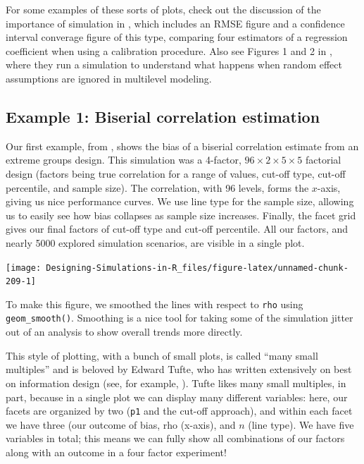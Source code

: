 \documentclass[
]{book}
\begin{document}
For some examples of these sorts of plots, check out the discussion of the importance of simulation in \citet{little2013praise}, which includes an RMSE figure and a confidence interval converage figure of this type, comparing four estimators of a regression coefficient when using a calibration procedure.
Also see Figures 1 and 2 in \citet{antonakis2021ignoring}, where they run a simulation to understand what happens when random effect assumptions are ignored in multilevel modeling.

\subsection{Example 1: Biserial correlation estimation}\label{example-1-biserial-correlation-estimation}

Our first example, from \citet{pustejovsky2014converting}, shows the bias of a biserial correlation estimate from an extreme groups design.
This simulation was a 4-factor, \(96 \times 2 \times 5 \times 5\) factorial design (factors being true correlation for a range of values, cut-off type, cut-off percentile, and sample size).
The correlation, with 96 levels, forms the \(x\)-axis, giving us nice performance curves.
We use line type for the sample size, allowing us to easily see how bias collapses as sample size increases.
Finally, the facet grid gives our final factors of cut-off type and cut-off percentile.
All our factors, and nearly 5000 explored simulation scenarios, are visible in a single plot.

\begin{center}\texttt{[image: Designing-Simulations-in-R\_files/figure-latex/unnamed-chunk-209-1]} \end{center}

To make this figure, we smoothed the lines with respect to \texttt{rho} using \texttt{geom\_smooth()}.
Smoothing is a nice tool for taking some of the simulation jitter out of an analysis to show overall trends more directly.

This style of plotting, with a bunch of small plots, is called
``many small multiples'' and is beloved by Edward Tufte, who has written extensively on best on information design (see, for example, \citet{tufte1983visual}).
Tufte likes many small multiples, in part, because in a single plot we can display many different variables: here, our facets are organized by two (\texttt{p1} and the cut-off approach), and within each facet we have three (our outcome of bias, rho (x-axis), and \(n\) (line type).
We have five variables in total; this means we can fully show all combinations of our factors along with an outcome in a four factor experiment!
\end{document}
